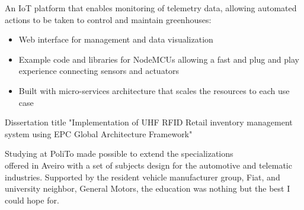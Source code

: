\documentclass[10pt,a4paper,ragged2e,withhyper]{altacv}
\begin{document}
\begin{paracol}{2}

An IoT platform that enables monitoring of telemetry data, allowing automated actions to be taken to control and maintain greenhouses:
\begin{itemize}
\item Web interface for management and data visualization
\item Example code and libraries for NodeMCUs allowing a fast and plug and play experience connecting sensors and actuators
\item Built with micro-services architecture that scales the resources to each use case
\end{itemize}

\medskip





Dissertation title "Implementation of UHF RFID Retail inventory management system using EPC Global Architecture Framework"
\iffalse
\begin{itemize}
  \item RF survey of industrial shelves for EPC Class1 Gen2 passive tag readings
  \item Optimized RF operations, report contents and tag filtering through the LLRP protocol
  \item Architecture follows the supply-chain specifications in the EPC Global Framework
  \item Used Docker to containerize and orchestrate Fosstrak Java services
  \item Developed HTTP services (REST, websockets) using Golang
  \item Developed a web interface for inventory management with React JS
\end{itemize} 
\fi

\divider


Studying at PoliTo made possible to extend the specializations \\ offered in Aveiro with a set of subjects design for the automotive and telematic industries. Supported by the resident vehicle manufacturer group, Fiat, and university neighbor, General Motors, the education was nothing but the best I could hope for.


\end{paracol}
\end{document}
